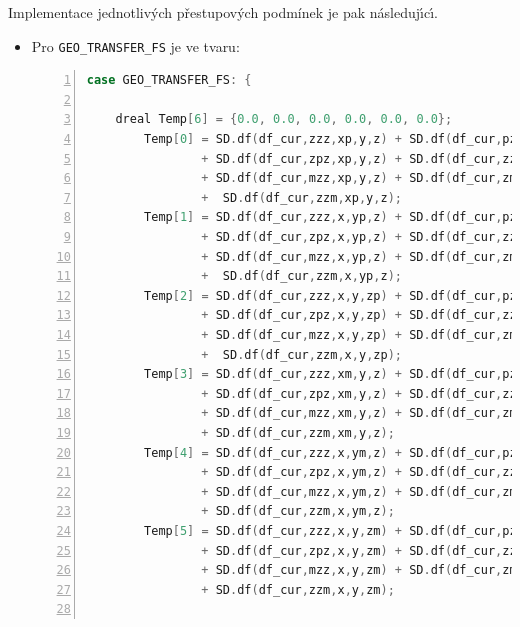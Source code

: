         Implementace jednotliv\'{y}ch p\v{r}estupov\'{y}ch podm\'{i}nek je pak n\'{a}sleduj\'{\i}c\'{\i}.
        \begin{itemize}
            \item Pro \texttt{\lstinline{GEO_TRANSFER_FS}} je ve tvaru:
                \begin{lstlisting}[frame=single, backgroundcolor=\color{light-gray}, commentstyle=\color{codegray}, basicstyle=\footnotesize\ttfamily, language=C++, numbers=left, numberstyle=\tiny\color{black}]
case GEO_TRANSFER_FS: {
    
    dreal Temp[6] = {0.0, 0.0, 0.0, 0.0, 0.0, 0.0};
        Temp[0] = SD.df(df_cur,zzz,xp,y,z) + SD.df(df_cur,pzz,xp,y,z) 
                + SD.df(df_cur,zpz,xp,y,z) + SD.df(df_cur,zzp,xp,y,z) 
                + SD.df(df_cur,mzz,xp,y,z) + SD.df(df_cur,zmz,xp,y,z) 
                +  SD.df(df_cur,zzm,xp,y,z);
        Temp[1] = SD.df(df_cur,zzz,x,yp,z) + SD.df(df_cur,pzz,x,yp,z) 
                + SD.df(df_cur,zpz,x,yp,z) + SD.df(df_cur,zzp,x,yp,z) 
                + SD.df(df_cur,mzz,x,yp,z) + SD.df(df_cur,zmz,x,yp,z) 
                +  SD.df(df_cur,zzm,x,yp,z);
        Temp[2] = SD.df(df_cur,zzz,x,y,zp) + SD.df(df_cur,pzz,x,y,zp) 
                + SD.df(df_cur,zpz,x,y,zp) + SD.df(df_cur,zzp,x,y,zp) 
                + SD.df(df_cur,mzz,x,y,zp) + SD.df(df_cur,zmz,x,y,zp) 
                +  SD.df(df_cur,zzm,x,y,zp);
        Temp[3] = SD.df(df_cur,zzz,xm,y,z) + SD.df(df_cur,pzz,xm,y,z) 
                + SD.df(df_cur,zpz,xm,y,z) + SD.df(df_cur,zzp,xm,y,z) 
                + SD.df(df_cur,mzz,xm,y,z) + SD.df(df_cur,zmz,xm,y,z) 
                + SD.df(df_cur,zzm,xm,y,z);
        Temp[4] = SD.df(df_cur,zzz,x,ym,z) + SD.df(df_cur,pzz,x,ym,z) 
                + SD.df(df_cur,zpz,x,ym,z) + SD.df(df_cur,zzp,x,ym,z) 
                + SD.df(df_cur,mzz,x,ym,z) + SD.df(df_cur,zmz,x,ym,z) 
                + SD.df(df_cur,zzm,x,ym,z);
        Temp[5] = SD.df(df_cur,zzz,x,y,zm) + SD.df(df_cur,pzz,x,y,zm) 
                + SD.df(df_cur,zpz,x,y,zm) + SD.df(df_cur,zzp,x,y,zm) 
                + SD.df(df_cur,mzz,x,y,zm) + SD.df(df_cur,zmz,x,y,zm) 
                + SD.df(df_cur,zzm,x,y,zm);
        

\end{lstlisting}
\end{itemize}
